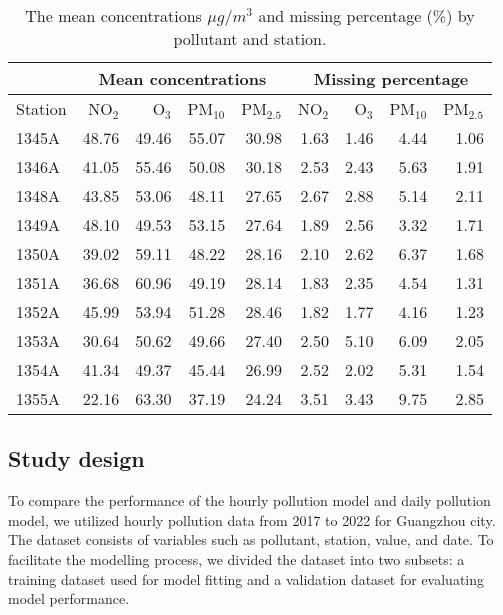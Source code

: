 \documentclass[
  12,
]{article}
\begin{document}
\begin{table}[h]

\caption{\label{tab:datasummary2}The mean concentrations $\mu g/m^{3}$ and missing percentage (\%) by pollutant and station.}
\centering
\begin{tabular}[t]{lrrrrrrrr}\hline
\multicolumn{1}{c}{\textbf{ }} & \multicolumn{4}{c}{\textbf{Mean concentrations}} & \multicolumn{4}{c}{\textbf{Missing percentage}} \\\hline
Station & NO$_2$ & O$_3$ & PM$_{10}$ & PM$_{2.5}$ & NO$_2$ & O$_3$ & PM$_{10}$ & PM$_{2.5}$\\\hline
1345A & 48.76 & 49.46 & 55.07 & 30.98 & 1.63 & 1.46 & 4.44 & 1.06\\
1346A & 41.05 & 55.46 & 50.08 & 30.18 & 2.53 & 2.43 & 5.63 & 1.91\\
1348A & 43.85 & 53.06 & 48.11 & 27.65 & 2.67 & 2.88 & 5.14 & 2.11\\
1349A & 48.10 & 49.53 & 53.15 & 27.64 & 1.89 & 2.56 & 3.32 & 1.71\\
1350A & 39.02 & 59.11 & 48.22 & 28.16 & 2.10 & 2.62 & 6.37 & 1.68\\
1351A & 36.68 & 60.96 & 49.19 & 28.14 & 1.83 & 2.35 & 4.54 & 1.31\\
1352A & 45.99 & 53.94 & 51.28 & 28.46 & 1.82 & 1.77 & 4.16 & 1.23\\
1353A & 30.64 & 50.62 & 49.66 & 27.40 & 2.50 & 5.10 & 6.09 & 2.05\\
1354A & 41.34 & 49.37 & 45.44 & 26.99 & 2.52 & 2.02 & 5.31 & 1.54\\
1355A & 22.16 & 63.30 & 37.19 & 24.24 & 3.51 & 3.43 & 9.75 & 2.85\\\hline
\end{tabular}
\end{table}

\hypertarget{study-design}{%
\subsection{Study design}\label{study-design}}

To compare the performance of the hourly pollution model and daily
pollution model, we utilized hourly pollution data from 2017 to 2022 for
Guangzhou city. The dataset consists of variables such as pollutant,
station, value, and date. To facilitate the modelling process, we
divided the dataset into two subsets: a training dataset used for model
fitting and a validation dataset for evaluating model performance.
\end{document}

